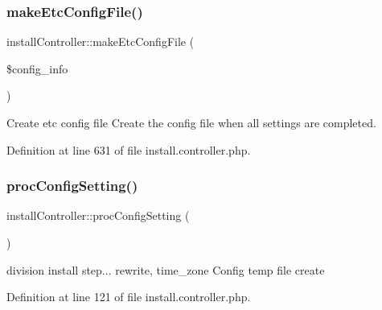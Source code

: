 \mbox{\label{classinstallController_a87b331e263614e15c5366284648f6ee0}} 
\subsubsection{\texorpdfstring{make\+Etc\+Config\+File()}{makeEtcConfigFile()}}
{\footnotesize\ttfamily install\+Controller\+::make\+Etc\+Config\+File (\begin{DoxyParamCaption}\item[{}]{\$config\+\_\+info }\end{DoxyParamCaption})}



Create etc config file Create the config file when all settings are completed. 



Definition at line 631 of file install.\+controller.\+php.

\mbox{\label{classinstallController_a070de62caeaa36e7bfa2b50be905cfde}} 
\subsubsection{\texorpdfstring{proc\+Config\+Setting()}{procConfigSetting()}}
{\footnotesize\ttfamily install\+Controller\+::proc\+Config\+Setting (\begin{DoxyParamCaption}{ }\end{DoxyParamCaption})}



division install step... rewrite, time\+\_\+zone Config temp file create 



Definition at line 121 of file install.\+controller.\+php.

\mbox{\label{classinstallController_a275ce5057c0171e2582739506cec99cb}} 
